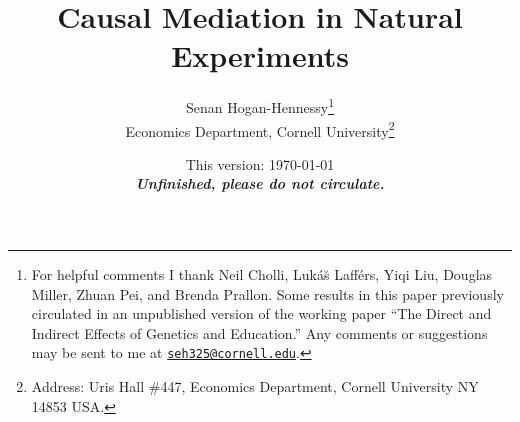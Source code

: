 \documentclass[notitlepage,12pt]{article}
\author{Senan Hogan-Hennessy\thanks{
    For helpful comments I thank
    Neil Cholli,
    Luk\'a\u{s} Laff\'ers,
    Yiqi Liu,
    Douglas Miller,
    Zhuan Pei,
    and
    Brenda Prallon.
    Some results in this paper previously circulated in an unpublished version of the working paper ``The Direct and Indirect Effects of Genetics and Education.''
    Any comments or suggestions may be sent to me at \href{mailto:seh325@cornell.edu}{\nolinkurl{seh325@cornell.edu}}.
    } \\
    \vspace{0.1cm}
    Economics Department, Cornell University\footnote{
        Address: Uris Hall \#447, Economics Department, Cornell University NY 14853 USA.
    }
}
\title{Causal Mediation in Natural Experiments}
\date{This version: \today \\ \vspace{0.25cm}
    \textbf{\textit{Unfinished, please do not circulate.}}
    \vspace{-0.5cm}
}
\begin{document}
\clearpage
\maketitle
\thispagestyle{empty}
\begin{abstract}
    
\end{abstract}

\newpage
\setcounter{page}{1}
\doublespacing
\noindent






\singlespacing


%
\newpage

\end{document}
